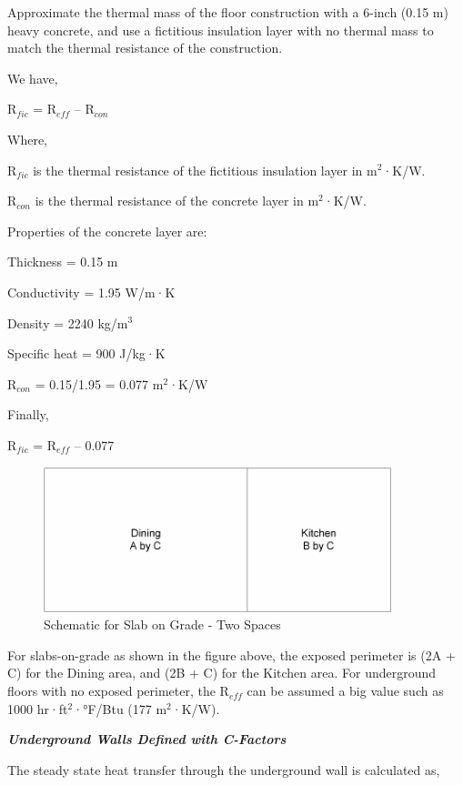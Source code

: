 Approximate the thermal mass of the floor construction with a 6-inch (0.15 m) heavy concrete, and use a fictitious insulation layer with no thermal mass to match the thermal resistance of the construction.

We have,

R\(_{fic}\) = R\(_{eff}\) -- R\(_{con}\)

Where,

R\(_{fic}\) is the thermal resistance of the fictitious insulation layer in m\(^{2}\)·K/W.

R\(_{con}\) is the thermal resistance of the concrete layer in m\(^{2}\)·K/W.

Properties of the concrete layer are:

Thickness = 0.15 m

Conductivity = 1.95 W/m·K

Density = 2240 kg/m\(^{3}\)

Specific heat = 900 J/kg·K

R\(_{con}\) = 0.15/1.95 = 0.077 m\(^{2}\)·K/W

Finally,

R\(_{fic}\) = R\(_{eff}\) -- 0.077

\begin{figure}[hbtp] %
\centering
\includegraphics[width=0.9\textwidth, height=0.9\textheight, keepaspectratio=true]{media/image435.png}
\caption{Schematic for Slab on Grade - Two Spaces \protect \label{fig:schematic-for-slab-on-grade-two-spaces}}
\end{figure}

For slabs-on-grade as shown in the figure above, the exposed perimeter is (2A + C) for the Dining area, and (2B + C) for the Kitchen area. For underground floors with no exposed perimeter, the R\(_{eff}\) can be assumed a big value such as 1000 hr·ft\(^{2}\)·°F/Btu (177 m\(^{2}\)·K/W).

\textbf{\emph{Underground Walls Defined with C-Factors}}

The steady state heat transfer through the underground wall is calculated as,

